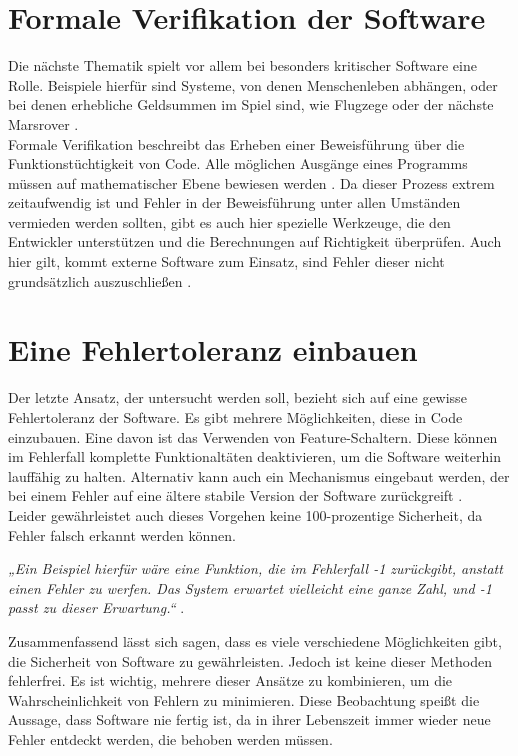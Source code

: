 \section{Formale Verifikation der Software}
Die nächste Thematik spielt vor allem bei besonders kritischer Software eine Rolle.
Beispiele hierfür sind Systeme, von denen Menschenleben abhängen, oder bei denen erhebliche Geldsummen im Spiel sind, wie Flugzege oder der nächste Marsrover \citep[S. 324]{fiveLines.2023}.\\
Formale Verifikation beschreibt das Erheben einer Beweisführung über die Funktionstüchtigkeit von Code. Alle möglichen Ausgänge eines Programms müssen auf mathematischer Ebene bewiesen werden \cite{glinz2004formale}.
Da dieser Prozess extrem zeitaufwendig ist und Fehler in der Beweisführung unter allen Umständen vermieden werden sollten, gibt es auch hier spezielle Werkzeuge, die den Entwickler unterstützen und die Berechnungen auf Richtigkeit überprüfen.
Auch hier gilt, kommt externe Software zum Einsatz, sind Fehler dieser nicht grundsätzlich auszuschließen \citep[S. 324]{fiveLines.2023}.

\section{Eine Fehlertoleranz einbauen}
Der letzte Ansatz, der untersucht werden soll, bezieht sich auf eine gewisse Fehlertoleranz der Software.
Es gibt mehrere Möglichkeiten, diese in Code einzubauen. 
Eine davon ist das Verwenden von Feature-Schaltern. Diese können im Fehlerfall komplette Funktionaltäten deaktivieren, um die Software weiterhin lauffähig zu halten.
Alternativ kann auch ein Mechanismus eingebaut werden, der bei einem Fehler auf eine ältere stabile Version der Software zurückgreift \citep[S. 324]{fiveLines.2023}. \\
Leider gewährleistet auch dieses Vorgehen keine 100-prozentige Sicherheit, da Fehler falsch erkannt werden können.\\
\begin{singlespace}
\textit{„Ein Beispiel hierfür wäre eine Funktion, die im Fehlerfall -1 zurückgibt, anstatt einen Fehler zu werfen. Das System erwartet vielleicht eine ganze Zahl, und -1 passt zu dieser Erwartung.“} \citep[S. 324]{fiveLines.2023}.\\
\end{singlespace}
\par
Zusammenfassend lässt sich sagen, dass es viele verschiedene Möglichkeiten gibt, die Sicherheit von Software zu gewährleisten. Jedoch ist keine dieser Methoden fehlerfrei. Es ist wichtig, mehrere dieser Ansätze zu kombinieren, um die Wahrscheinlichkeit von Fehlern zu minimieren.
Diese Beobachtung speißt die Aussage, dass Software nie fertig ist, da in ihrer Lebenszeit immer wieder neue Fehler entdeckt werden, die behoben werden müssen.